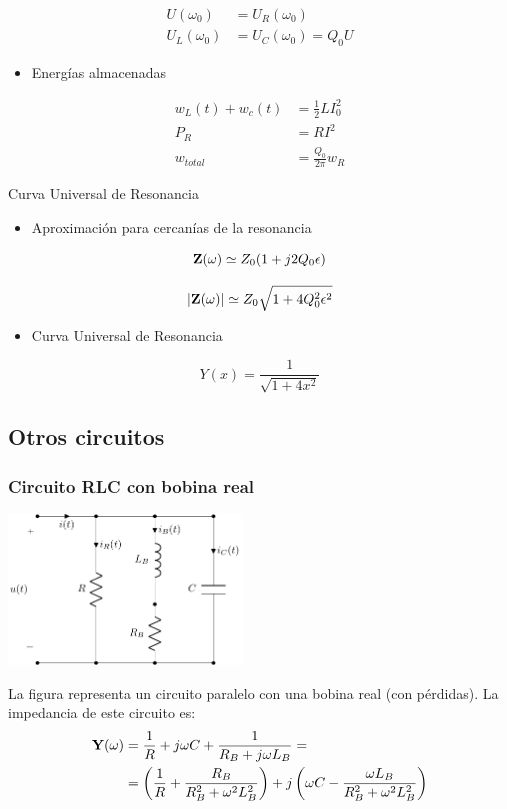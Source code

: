 \begin{align*}
  U(\omega_0) &= U_R(\omega_0)\\
  U_L(\omega_0) &= U_C(\omega_0) = Q_0 U
\end{align*}

\begin{itemize}
\item Energías almacenadas
\end{itemize}

\begin{align*}
  w_L(t) + w_c(t) &= \frac{1}{2} L I_0^2\\
  P_R &= R I^2\\
  w_{total} &= \frac{Q_0}{2\pi} w_R
\end{align*}

{Curva Universal de Resonancia}

\begin{itemize}
\item Aproximación para cercanías de la resonancia
\end{itemize}
\[
  \mathbf{Z}(\omega) \simeq Z_0 (1 + j 2 Q_0 \epsilon)
\]

\[
  |\mathbf{Z}(\omega)| \simeq Z_0 \sqrt{1 + 4 Q^2_0 \epsilon^2}
\]
\begin{itemize}
\item Curva Universal de Resonancia
\end{itemize}
\[
  Y(x) = \frac{1}{\sqrt{1 + 4 x^2}}
\]
\subsection{Otros circuitos}
\label{sec:org02b2019}

\subsubsection{Circuito RLC con bobina real}
\label{sec:orgfc5a9de}
\begin{center}
\includegraphics[height=4cm]{../figs/resonante_real.pdf}
\end{center}

La figura representa un circuito paralelo con una bobina real (con pérdidas). La impedancia de este circuito es:
\begin{align*}
\mathbf{Y}(\omega) &= \frac{1}{R} + j \omega C + \frac{1}{R_B + j \omega L_B} = \\ 
          &= \left(\frac{1}{R} + \frac{R_B}{R_B^2 + \omega^2 L_B^2}\right) + j \left(\omega C - \frac{\omega L_B}{R_B^2 + \omega^2 L_B^2}\right)
\end{align*}

